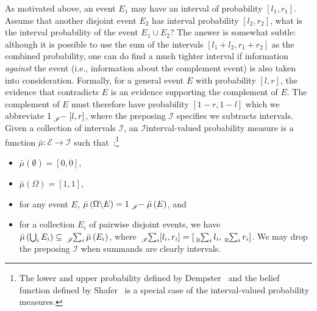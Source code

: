 \documentclass{article}
\theoremstyle{remark}
\newcommand{\events}{\ensuremath{\mathcal{E}}}
\newcommand{\necess}{{\mbox{\wesa{certain}}}}
\begin{document}
As motivated above, an event $E_{1}$ may have an interval of probability
$[l_{1},r_{1}]$. Assume that another disjoint event $E_{2}$ has
interval probability $[l_{2},r_{2}]$, what is the interval probability
of the event $E_{1}\cup E_{2}$? The answer is somewhat subtle: although
it is possible to use the sum of the intervals $[l_{1}+l_{2},r_{1}+r_{2}]$
as the combined probability, one can do find a much tighter interval
if information \emph{against} the event (i.e., information about the
complement event) is also taken into consideration. Formally, for
a general event $E$ with probability $[l,r]$, the evidence that
contradicts $E$ is an evidence supporting the complement of $E$.
The complement of $E$ must therefore have probability $\left[1-r,1-l\right]$
which we abbreviate $1\tensor*[_{\mathscr{I}}]{-}{}\left[l,r\right]$,
where the preposing $\mathscr{I}$ specifies we subtracts intervals.
Given a collection of intervals $\mathscr{I}$, an $\mathscr{I}$\textendash interval-valued
probability measure is a function $\bar{\mu}:\events\rightarrow\mathscr{I}$
such that~\cite{JamisonLodwick2004}:\footnote{The lower and upper probability defined by Dempster~\cite{Dempster1967}
and the belief function defined by Shafer~\cite{Shafer1976} is a
special case of the interval-valued probability measures. } 
\begin{itemize}
\item $\bar{\mu}(\emptyset)=[0,0]$, 
\item $\bar{\mu}(\Omega)=[1,1]$, 
\item for any event $E$, $\bar{\mu}\left(\Omega\backslash
E\right)=1\tensor*[_{\mathscr{I}}]{-}{}\bar{\mu}\left(E\right)$, and 
\item for a collection $E_{i}$ of pairwise disjoint events, we have $\bar{\mu}\left(\bigcup_{i}E_{i}\right)\subseteq\tensor*[_{\mathscr{I}}]{\sum}{_{i}}\bar{\mu}\left(E_{i}\right)$,
where $\tensor*[_{\mathscr{I}}]{\sum}{_{i}}[l_{i},r_{i}]=\left[\tensor*[_{\mathbb{R}}]{\sum}{_{i}}l_{i},\tensor*[_{\mathbb{R}}]{\sum}{_{i}}r_{i}\right]$.
We may drop the preposing $\mathscr{I}$ when summands are clearly intervals. 
\end{itemize}

\end{document}
